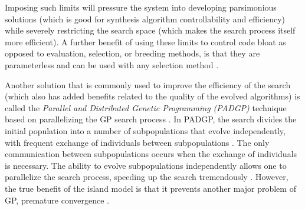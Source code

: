 \documentclass[a4paper,12pt]{report} 	%
\numberwithin{figure}{chapter}
\numberwithin{table}{chapter}
\numberwithin{equation}{chapter}
\begin{document}
\begin{flushleft}
Imposing such limits will pressure the system into developing parsimonious solutions (which is good for synthesis algorithm controllability and efficiency) while severely restricting the search space (which makes the search process itself more efficient). A further benefit of using these limits to control code bloat as opposed to evaluation, selection, or breeding methods, is that they are parameterless and can be used with any selection method \cite[p. 97]{Silva:2008le}.

Another solution that is commonly used to improve the efficiency of the search (which also has added benefits related to the quality of the evolved algorithms) is called the \emph{Parallel and Distributed Genetic Programming (PADGP)} technique based on parallelizing the GP search process \cite[p. 13]{Vanneschi:2004le}. In PADGP, the search divides the initial population into a number of subpopulations that evolve independently, with frequent exchange of individuals between subpopulations \cite[p. 174]{Vanneschi:2004le}. The only communication between subpopulations occurs when the exchange of individuals is necessary. The ability to evolve subpopulations independently allows one to parallelize the search process, speeding up the search tremendously \cite[p. 173]{Vanneschi:2004le}. However, the true benefit of the island model is that it prevents another major problem of GP, premature convergence \cite[p. 15]{Vanneschi:2004le}.


\end{flushleft}
\end{document}
